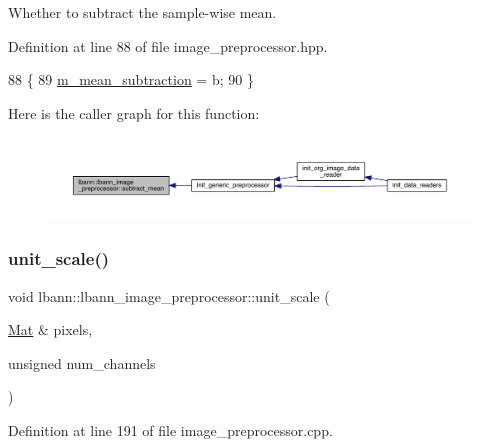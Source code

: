 Whether to subtract the sample-\/wise mean. 

Definition at line 88 of file image\+\_\+preprocessor.\+hpp.


\begin{DoxyCode}
88                              \{
89     \hyperlink{classlbann_1_1lbann__image__preprocessor_a734002307d0ef95a31d75a295fa5c3d1}{m\_mean\_subtraction} = b;
90   \}
\end{DoxyCode}
Here is the caller graph for this function\+:\nopagebreak
\begin{figure}[H]
\begin{center}
\leavevmode
\includegraphics[width=350pt]{classlbann_1_1lbann__image__preprocessor_afa470b696ba435c20050187a0232717d_icgraph}
\end{center}
\end{figure}
\mbox{\label{classlbann_1_1lbann__image__preprocessor_aa7a8926d0544100f7d3caa9289d94826}} 
\subsubsection{\texorpdfstring{unit\+\_\+scale()}{unit\_scale()}}
{\footnotesize\ttfamily void lbann\+::lbann\+\_\+image\+\_\+preprocessor\+::unit\+\_\+scale (\begin{DoxyParamCaption}\item[{\hyperlink{base_8hpp_a68f11fdc31b62516cb310831bbe54d73}{Mat} \&}]{pixels,  }\item[{unsigned}]{num\+\_\+channels }\end{DoxyParamCaption})\hspace{0.3cm}{\ttfamily [protected]}}



Definition at line 191 of file image\+\_\+preprocessor.\+cpp.



